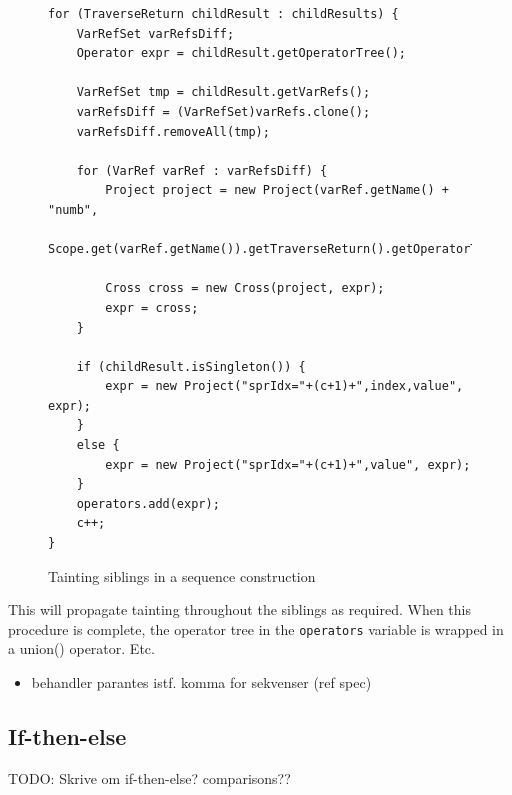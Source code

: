 \begin{figure}[!htp]
\begin{center}
\lstset{language=Java,numbers=left}
\begin{lstlisting}
for (TraverseReturn childResult : childResults) {
    VarRefSet varRefsDiff;
    Operator expr = childResult.getOperatorTree();
    
    VarRefSet tmp = childResult.getVarRefs();
    varRefsDiff = (VarRefSet)varRefs.clone();
    varRefsDiff.removeAll(tmp);

    for (VarRef varRef : varRefsDiff) {
        Project project = new Project(varRef.getName() + "numb", 
                Scope.get(varRef.getName()).getTraverseReturn().getOperatorTree());
        
        Cross cross = new Cross(project, expr);
        expr = cross;
    }

    if (childResult.isSingleton()) {
        expr = new Project("sprIdx="+(c+1)+",index,value", expr);
    }
    else {
        expr = new Project("sprIdx="+(c+1)+",value", expr);
    }
    operators.add(expr);
    c++;
}
\end{lstlisting}
  \caption{Tainting siblings in a sequence construction}
  \label{fig:impl:td:seq_constr_tainting_siblings}
\end{center}
\end{figure}

This will propagate tainting throughout the siblings as required. When this
procedure is complete, the operator tree in the \texttt{operators} variable is
wrapped in a \textsf{union()} operator. Etc.

\begin{itemize}
  \item behandler parantes istf. komma for sekvenser (ref spec) 
\end{itemize}

\subsection{If-then-else}
TODO: Skrive om if-then-else? comparisons??

